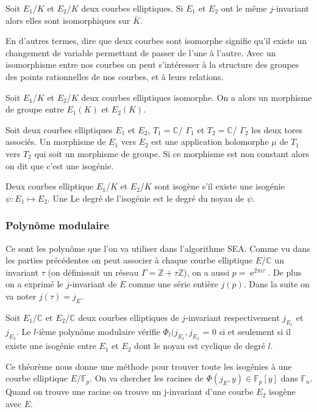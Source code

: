 \documentclass{article}
\DeclareMathOperator{\e}{e}
\begin{document}
\begin{defi}
Soit $E_1$/$K$ et $E_2$/$K$ deux courbes elliptiques. Si $E_1$ et $E_2$ ont le même $j$-invariant alors elles sont isomorphiques sur $\bar{K}$. 
\end{defi}
En d'autres termes, dire que deux courbes sont isomorphe signifie qu'il existe un changement de variable permettant de passer de l'une à l'autre. Avec un isomorphisme entre nos courbes on peut s'intéresser à la structure des groupes des points rationnelles de nos courbes, et à leurs relations.

\begin{prop}
Soit $E_1$/$K$ et $E_2$/$K$ deux courbes elliptiques isomorphe. On a alors un morphisme de groupe entre $E_1(K)$ et $E_2(K)$.
\end{prop}

\begin{defi}
Soit deux courbes elliptiques $E_1$ et $E_2$, $T_1=\mathbb{C}$/ $\Gamma_1$ et $T_2 = \mathbb{C}$/ $\Gamma_2$ les deux tores associés. Un morphisme de $E_1$ vers $E_2$ est une application holomorphe $\mu$ de $T_1$ vers $T_2$ qui soit un morphisme de groupe. Si ce morphisme est non constant alors on dit que c'est une isogénie.
\end{defi}

Deux courbes elliptique $E_1$/$K$ et $E_2$/$K$ sont isogène s'il existe une isogénie $\psi : E_1 \mapsto E_2$. Une Le degré de l’isogénie est le degré du noyau de $\psi$.


\subsubsection{Polynôme modulaire}
Ce sont les polynôme que l'on va utiliser dans l'algorithme SEA. Comme vu dans les parties précédentes on peut associer à chaque courbe elliptique $E$/$\mathbb{C}$ un invariant $\tau$ (on définissait un réseau $\Gamma = \mathbb{Z}+\tau \mathbb{Z}$), on a aussi $p=\e^{2\pi i \tau}$. De plus on a exprimé le $j$-invariant de $E$ comme une série entière $j(p)$. Dans la suite on va noter $j(\tau) = j_E$.

\begin{defi}
Soit $E_1$/$\mathbb{C}$ et $E_2$/$\mathbb{C}$ deux courbes elliptiques de $j$-invariant respectivement $j_{E_1}$ et $j_{E_2}$. Le $l$-ième polynôme modulaire vérifie $\Phi_l(j_{E_1},j_{E_2}$ = 0 si et seulement si il existe une isogénie entre $E_1$ et $E_2$ dont le noyau est cyclique de degré $l$.
\end{defi}

Ce théorème nous donne une méthode pour trouver toute les isogénies à une courbe elliptique $E$/$\mathbb{F}_p$. On va chercher les racines de $\Phi(j_E, y) \in \mathbb{F}_p[y]$ dans $\mathbb{F}_n$. Quand on trouve une racine on trouve un j-invariant d'une courbe $E_2$ isogène avec $E$.
\end{document}
